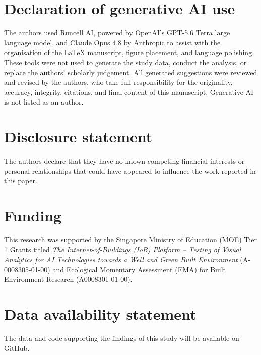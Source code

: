 \documentclass[]{interact}
\begin{document}
\section*{Declaration of generative AI use}
The authors used Runcell AI, powered by OpenAI's GPT-5.6 Terra large language model, and Claude Opus 4.8 by Anthropic to assist with the organisation of the \LaTeX{} manuscript, figure placement, and language polishing. These tools were not used to generate the study data, conduct the analysis, or replace the authors' scholarly judgement. All generated suggestions were reviewed and revised by the authors, who take full responsibility for the originality, accuracy, integrity, citations, and final content of this manuscript. Generative AI is not listed as an author.

\section*{Disclosure statement}
The authors declare that they have no known competing financial interests or personal relationships that could have appeared to influence the work reported in this paper.

\section*{Funding}
This research was supported by the Singapore Ministry of Education (MOE) Tier 1 Grants titled \textit{The Internet-of-Buildings (IoB) Platform -- Testing of Visual Analytics for AI Technologies towards a Well and Green Built Environment} (A-0008305-01-00) and Ecological Momentary Assessment (EMA) for Built Environment Research (A0008301-01-00).

\section*{Data availability statement}
The data and code supporting the findings of this study will be available on GitHub. 



\end{document}
